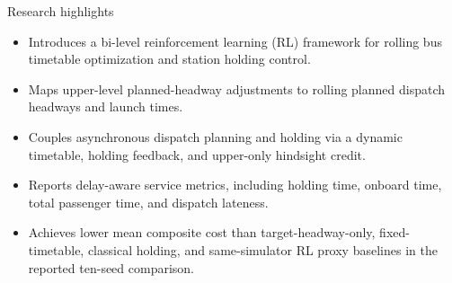 \documentclass[10pt]{article}
\begin{document}
\begin{center}
{\Large Research highlights}
\end{center}

\begin{itemize}
  \setlength{\itemsep}{0.35em}
  \item Introduces a bi-level reinforcement learning (RL) framework for rolling bus timetable optimization and station holding control.
  \item Maps upper-level planned-headway adjustments to rolling planned dispatch headways and launch times.
  \item Couples asynchronous dispatch planning and holding via a dynamic timetable, holding feedback, and upper-only hindsight credit.
  \item Reports delay-aware service metrics, including holding time, onboard time, total passenger time, and dispatch lateness.
  \item Achieves lower mean composite cost than target-headway-only, fixed-timetable, classical holding, and same-simulator RL proxy baselines in the reported ten-seed comparison.
\end{itemize}
\end{document}
